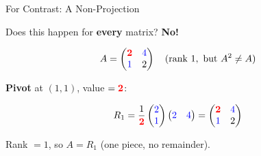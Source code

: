 \documentclass[10pt]{beamer}
\theoremstyle{definition}
\newcommand{\x}[1]{\alert{\textbf{#1}}}
\newcommand{\pvt}[1]{{\color{red}\mathbf{#1}}}       %
\newcommand{\crs}[1]{{\color{blue}#1}}                %
\begin{document}
\begin{frame}{For Contrast: A Non-Projection}

Does this happen for \x{every} matrix? \quad \x{No!}

\vspace{0.3em}

$$A = \begin{pmatrix} \pvt{2} & \crs{4} \\ \crs{1} & 2 \end{pmatrix} \quad (\text{rank } 1, \text{ but } A^2 \neq A)$$

\x{Pivot} at $(1,1)$, value $= \pvt{2}$:

$$R_1 = \frac{1}{\pvt{2}}\begin{pmatrix} \crs{2} \\ \crs{1} \end{pmatrix} \begin{pmatrix} \crs{2} & \crs{4} \end{pmatrix}
= \begin{pmatrix} \pvt{2} & \crs{4} \\ \crs{1} & 2 \end{pmatrix}$$

Rank $= 1$, so $A = R_1$ (one piece, no remainder).

\end{frame}
\end{document}

